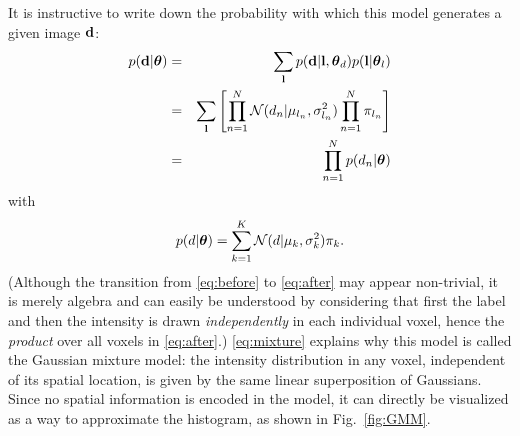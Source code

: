 \documentclass[10pt,twoside]{book}
\begin{document}
It is instructive to write down the probability with which this model generates a given image $\mathbf{d}$:
\begin{eqnarray}
  p( \mathbf{d} | {\mbox{\boldmath {${\theta}$}}} ) & = & \sum_{\mathbf{l}} p( \mathbf{d} | \mathbf{l}, {\mbox{\boldmath {${\theta}$}}}_d ) p(\mathbf{l} | {\mbox{\boldmath {${\theta}$}}}_l ) \nonumber \\
                                & = & \sum_{\mathbf{l}} \left[ \prod_{n=1}^N \mathcal N \mathnormal( d_n | \mu_{l_n}, \sigma_{l_n}^2 ) \prod_{n=1}^N \pi_{l_n} \right] \label{eq:before} \\
                                & = & \prod_{n=1}^N p( d_n | {\mbox{\boldmath {${\theta}$}}} ) \label{eq:after}
\end{eqnarray}
with 
\begin{equation}
  p( d | {\mbox{\boldmath {${\theta}$}}} ) = \sum_{k=1}^K \mathcal N \mathnormal( d | \mu_k, \sigma_k^2 ) \pi_k.
  \label{eq:mixture}
\end{equation}
(Although the transition from \eqref{eq:before} to \eqref{eq:after} may appear non-trivial, it is merely algebra and can easily be understood by considering that first the label and then the intensity is drawn \emph{independently} in each individual voxel, hence the \emph{product} over all voxels in \eqref{eq:after}.)
\eqref{eq:mixture} explains why this model is called the Gaussian mixture model: the intensity distribution in any voxel, independent of its spatial location, is given by the same linear superposition of Gaussians. Since no spatial information is encoded in the model, it can directly be visualized as a way to approximate the histogram, as shown in Fig.~\ref{fig:GMM}. 
\end{document}
